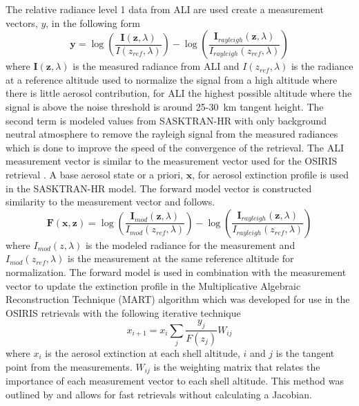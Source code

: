 \documentclass[12pt]{article}
\begin{document}
The relative radiance level 1 data from ALI are used create a measurement vectors, $y$, in the following form
\begin{equation}
    \mathbf{y} = \log\left(\frac{\mathbf{I}(\mathbf{z},\lambda)}{I(z_{ref},\lambda)}\right)-\log\left(\frac{\mathbf{I}_{rayleigh}(\mathbf{z},\lambda)}{I_{rayleigh}(z_{ref},\lambda)}\right)
    \label{eqn:measurementVector}
\end{equation}
where $\mathbf{I}(\mathbf{z},\lambda)$ is the measured radiance from ALI and $I(z_{ref},\lambda)$ is the radiance at a reference altitude used to normalize the signal from a high altitude where there is little aerosol contribution, for ALI the highest possible altitude where the signal is above the noise threshold is around 25-30~km tangent height. The second term is modeled values from SASKTRAN-HR with only background neutral atmosphere to remove the rayleigh signal from the measured radiances which is done to improve the speed of the convergence of the retrieval. The ALI measurement vector is similar to the measurement vector used for the OSIRIS retrieval \citep{Bourassa2007,Bourassa2011}. A base aerosol state or a priori, $\mathbf{x}$, for aerosol extinction profile is used in the SASKTRAN-HR model. The forward model vector is constructed similarity to the measurement vector and follows.
\begin{equation}
    \mathbf{F}(\mathbf{x},\mathbf{z}) = \log\left(\frac{\mathbf{I}_{mod}(\mathbf{z},\lambda)}{I_{mod}(z_{ref},\lambda)}\right)-\log\left(\frac{\mathbf{I}_{rayleigh}(\mathbf{z},\lambda)}{I_{rayleigh}(z_{ref},\lambda)}\right)
    \label{eqn:forwardModel}
\end{equation}
where $I_{mod}(z,\lambda)$ is the modeled radiance for the measurement and $I_{mod}(z_{ref},\lambda)$ is the measurement at the same reference altitude for normalization. The forward model is used in combination with the measurement vector to update the extinction profile in the Multiplicative Algebraic Reconstruction Technique (MART) algorithm which was developed for use in the OSIRIS retrievals \citep{Bourassa2012a} with the following iterative technique
\begin{equation}
    x_{i+1} = x_{i}\sum_{j}\frac{y_{j}}{F(z_{j})}W_{ij}
\end{equation}
where $x_{i}$ is the aerosol extinction at each shell altitude, $i$ and $j$ is the tangent point from the measurements. $W_{ij}$ is the weighting matrix that relates the importance of each measurement vector to each shell altitude. This method was outlined by \cite{Degenstein2009} and allows for fast retrievals without calculating a Jacobian.
\end{document}
